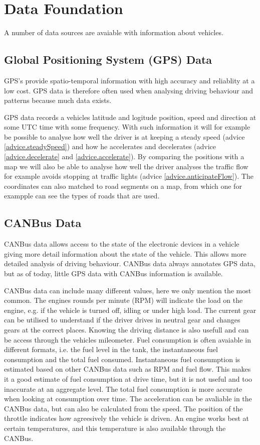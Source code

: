 \section{Data Foundation}
A number of data sources are avaiable with information about vehicles.%

\subsection{Global Positioning System (GPS) Data}
GPS's provide spatio-temporal information with high accuracy and reliablity at a low cost.
GPS data is therefore often used when analysing driving behaviour and patterns because much data exists. 

GPS data records a vehicles latitude and logitude position, speed and direction at some UTC time with some frequency. 
With such information it will for example be possible to analyse how well the driver is at keeping a steady speed (advice \ref{advice.steadySpeed}) and how he accelerates and decelerates (advice \ref{advice.decelerate} and \ref{advice.accelerate}). 
By comparing the positions with a map we will also be able to analyse how well the driver analyses the traffic flow for example avoids stopping at traffic lights (advice \ref{advice.anticipateFlow}).
The coordinates can also matched to road segments on a map, from which one for exampple can see the types of roads that are used.

\subsection{CANBus Data}
CANBus data allows access to the state of the electronic devices in a vehicle giving more detail information about the state of the vehicle. 
This allows more detailed analysis of driving behaviour.
CANBus data always annotates GPS data, but as of today, little GPS data with CANBus information is available.  

CANBus data can include many different values, here we only mention the most common.  
The engines rounds per minute (RPM) will indicate the load on the engine, e.g. if the vehicle is turned off, idling or under high load. 
The current gear can be utilised to understand if the driver drives in neutral gear and changes gears at the correct places.
Knowing the driving distance is also usefull and can be access through the vehicles mileometer. 
Fuel consumption is often avaiable in different formats, i.e. the fuel level in the tank, the instantaneous fuel consumption and the total fuel consumed. 
Instantaneous fuel consumption is estimated based on other CANBus data such as RPM and fuel flow. 
This makes it a good estimate of fuel consumption at drive time, but it is not useful and too inaccurate at an aggregate level.
The total fuel consumption is more accurate when looking at consumption over time.
The acceleration can be avaliable in the CANBus data, but can also be calculated from the speed. 
The position of the throttle indicates how agreesively the vehicle is driven.
An engine works best at certain temperatures, and this temperature is also available through the CANBus. 

